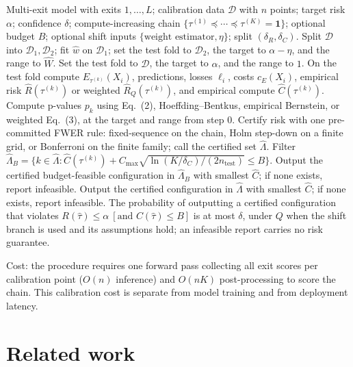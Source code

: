 \documentclass{ieeeaccess}
\begin{document}
\begin{algorithm}[t]
\caption{Compute-adaptive risk certification}
\begin{algorithmic}[1]
\Require Multi-exit model with exits $1,\ldots,L$; calibration data $\mathcal D$ with $n$ points; target risk $\alpha$; confidence $\delta$; compute-increasing chain $\{\tau^{(1)}\preceq\cdots\preceq\tau^{(K)}=\mathbf 1\}$; optional budget $B$; optional shift inputs $\{\text{weight estimator},\eta\}$; split $(\delta_R,\delta_C)$.
  \State Split $\mathcal D$ into $\mathcal D_1,\mathcal D_2$; fit $\hat w$ on $\mathcal D_1$; set the test fold to $\mathcal D_2$, the target to $\alpha-\eta$, and the range to $\hat W$.
\Else
  \State Set the test fold to $\mathcal D$, the target to $\alpha$, and the range to $1$.
\EndIf
{}
  \State On the test fold compute $E_{\tau^{(k)}}(X_i)$, predictions, losses $\ell_i$, costs $c_E(X_i)$, empirical risk $\hat R(\tau^{(k)})$ or weighted $\hat R_Q(\tau^{(k)})$, and empirical compute $\hat C(\tau^{(k)})$.
\EndFor
\State Compute p-values $p_k$ using Eq.\ (2), Hoeffding--Bentkus, empirical Bernstein, or weighted Eq.\ (3), at the target and range from step 0.
\State Certify risk with one pre-committed FWER rule: fixed-sequence on the chain, Holm step-down on a finite grid, or Bonferroni on the finite family; call the certified set $\hat\Lambda$.
  \State Filter $\hat\Lambda_B=\{k\in\hat\Lambda:\hat C(\tau^{(k)})+C_{\max}\sqrt{\ln(K/\delta_C)/(2n_{\mathrm{test}})}\le B\}$.
  \State Output the certified budget-feasible configuration in $\hat\Lambda_B$ with smallest $\hat C$; if none exists, report infeasible.
\Else
  \State Output the certified configuration in $\hat\Lambda$ with smallest $\hat C$; if none exists, report infeasible.
\EndIf
\Ensure The probability of outputting a certified configuration that violates $R(\hat\tau)\le\alpha\ [\text{and } C(\hat\tau)\le B]$ is at most $\delta$, under $Q$ when the shift branch is used and its assumptions hold; an infeasible report carries no risk guarantee.
\end{algorithmic}
\end{algorithm}

Cost: the procedure requires one forward pass collecting all exit scores per calibration point ($O(n)$ inference) and $O(nK)$ post-processing to score the chain. This calibration cost is separate from model training and from deployment latency.

\section{Related work}
\end{document}
